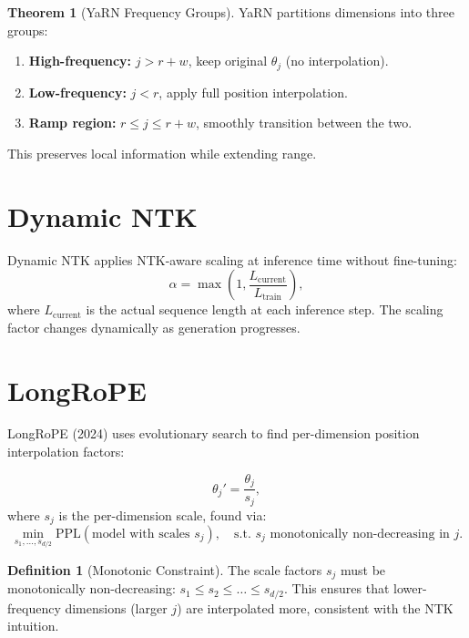 \documentclass[11pt,a4paper]{book}
\theoremstyle{definition}
\newtheorem{definition}{Definition}[chapter]
\newtheorem{theorem}{Theorem}[chapter]
\begin{document}
\begin{theorem}[YaRN Frequency Groups]
	YaRN partitions dimensions into three groups:
	\begin{enumerate}
		\item \textbf{High-frequency:} $j > r + w$, keep original $\theta_j$ (no interpolation).
		\item \textbf{Low-frequency:} $j < r$, apply full position interpolation.
		\item \textbf{Ramp region:} $r \leq j \leq r + w$, smoothly transition between the two.
	\end{enumerate}
	This preserves local information while extending range.
\end{theorem}

\section{Dynamic NTK}

Dynamic NTK applies NTK-aware scaling at inference time without fine-tuning:
\begin{equation}
	\alpha = \max\left(1, \frac{L_{\text{current}}}{L_{\text{train}}}\right),
\end{equation}
where $L_{\text{current}}$ is the actual sequence length at each inference step. The scaling factor changes dynamically as generation progresses.

\section{LongRoPE}

LongRoPE (2024) uses evolutionary search to find per-dimension position interpolation factors:

\begin{equation}
	\theta_j' = \frac{\theta_j}{s_j},
\end{equation}
where $s_j$ is the per-dimension scale, found via:
\begin{equation}
	\min_{s_1, \dots, s_{d/2}} \text{PPL}(\text{model with scales } s_j),
	\quad \text{s.t. } s_j \text{ monotonically non-decreasing in } j.
\end{equation}

\begin{definition}[Monotonic Constraint]
	The scale factors $s_j$ must be monotonically non-decreasing: $s_1 \leq s_2 \leq \dots \leq s_{d/2}$. This ensures that lower-frequency dimensions (larger $j$) are interpolated more, consistent with the NTK intuition.
\end{definition}
\end{document}
